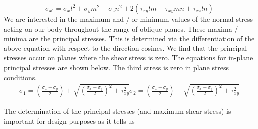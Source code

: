 \begin{equation}
    \sigma_{x'} = \sigma_xl^2 + \sigma_y m^2 +\sigma_zn^2 + 2\left(\tau_{xy}lm + \tau_{xy}mn + \tau_{xz}ln\right)
\end{equation}
We are interested in the maximum and / or minimum values of the normal stress acting on our body throughout the range of oblique planes. These maxima / minima are the principal stresses. This is determined via the differentiation of the above equation with respect to the direction cosines. We find that the principal stresses occur on planes where the shear stress is zero. The equations for in-plane principal stresses are shown below. The third stress is zero in plane stress conditions.
\begin{gather}
    \sigma_1 = \left(\frac{\sigma_x + \sigma_y}{2}\right)+ \sqrt{\left(\frac{\sigma_x - \sigma_y}{2} \right)^2+ \tau^2_{xy} }
    \sigma_2 = \left(\frac{\sigma_x + \sigma_y}{2}\right)- \sqrt{\left(\frac{\sigma_x - \sigma_y}{2} \right)^2+ \tau^2_{xy} }
\end{gather}

The determination of the principal stresses (and maximum shear stress) is important for design purposes as it tells us

\iffalse
Plane stress is a state of stress in which two faces of our 3D element are free of stress. We can define this stress state mathematically with:
\begin{gather}
    \sigma_x, \, \sigma_y, \, \tau_{xy}\\
    \sigma_z = \tau_{zx} = \tau_{zy} = 0
\end{gather}
The sum of the normal stresses acting on perpendicular faces of plane stress elements is constant and independent of the angle $\theta$.
\begin{gather}
    \sigma_{x1} = \sigma_x \cos^2 \theta + \sigma_y \sin^2 \theta + 2\tau_{xy}\sin\theta\cos\theta\\
    \sigma_{y1} = \sigma_x \sin^2 \theta + \sigma_y \cos^2 \theta - 2\tau_{xy}\sin\theta\cos\theta\\
    \sigma_{x1} + \sigma_{y1} = \sigma_x + \sigma_y
\end{gather}
With changing $\theta$, the normal and shear stress will have a maximum or minimum value.  these maxima / minima are the principal stresses. These maxima / minima are the principal stresses. We calculate this by taking the derivative of $\sigma_{x1}$ with respect to $\theta$ and equalling this to zero. $\theta_p$ is the angle at which the principal stress occurs and has two values, offset at \SI{90}{\degree}.
\fi

